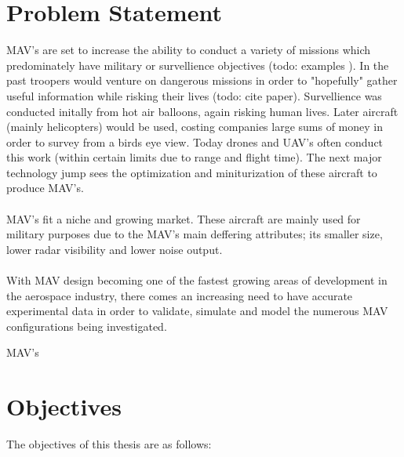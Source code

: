 


\section{Problem Statement}
\label{ProblemStatement}
MAV's are set to increase the ability to conduct a variety of missions which predominately have military or survellience objectives (todo: examples ). In the past troopers would venture on dangerous missions in order to "hopefully" gather useful information while risking their lives (todo: cite paper). Survellience was conducted initally from hot air balloons, again risking human lives. Later aircraft (mainly helicopters) would be used, costing companies large sums of money in order to survey from a birds eye view. Today drones and UAV's often conduct this work (within certain limits due to range and flight time). The next major technology jump sees the optimization and miniturization of these aircraft to produce MAV's. \\
\\
MAV's fit a niche and growing market. These aircraft are mainly used for military purposes due to the MAV's main deffering attributes; its smaller size, lower radar visibility and lower noise output.\\
\\
With MAV design becoming one of the fastest growing areas of development in the aerospace industry, there comes an increasing need to have accurate experimental data in order to validate, simulate and model the numerous MAV configurations being investigated. 

MAV's




\section{Objectives}
\label{sec:Objectives}
The objectives of this thesis are as follows:

